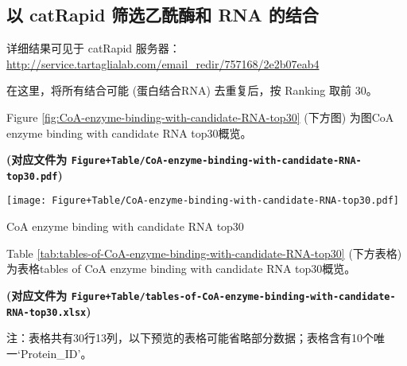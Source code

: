 \documentclass[
]{article}
\begin{document}
\hypertarget{ux4ee5-catrapid-ux7b5bux9009ux4e59ux9170ux9176ux548c-rna-ux7684ux7ed3ux5408}{%
\subsection{以 catRapid 筛选乙酰酶和 RNA 的结合}\label{ux4ee5-catrapid-ux7b5bux9009ux4e59ux9170ux9176ux548c-rna-ux7684ux7ed3ux5408}}

详细结果可见于 catRapid 服务器： \url{http://service.tartaglialab.com/email_redir/757168/2e2b07eab4}

在这里，将所有结合可能 (蛋白结合RNA) 去重复后，按 Ranking 取前 30。

Figure \ref{fig:CoA-enzyme-binding-with-candidate-RNA-top30} (下方图) 为图CoA enzyme binding with candidate RNA top30概览。

\textbf{(对应文件为 \texttt{Figure+Table/CoA-enzyme-binding-with-candidate-RNA-top30.pdf})}

\def\@captype{figure}
\begin{center}
\texttt{[image: Figure+Table/CoA-enzyme-binding-with-candidate-RNA-top30.pdf]}
\caption{CoA enzyme binding with candidate RNA top30}\label{fig:CoA-enzyme-binding-with-candidate-RNA-top30}
\end{center}

Table \ref{tab:tables-of-CoA-enzyme-binding-with-candidate-RNA-top30} (下方表格) 为表格tables of CoA enzyme binding with candidate RNA top30概览。

\textbf{(对应文件为 \texttt{Figure+Table/tables-of-CoA-enzyme-binding-with-candidate-RNA-top30.xlsx})}

\begin{center}\begin{tcolorbox}[colback=gray!10, colframe=gray!50, width=0.9\linewidth, arc=1mm, boxrule=0.5pt]注：表格共有30行13列，以下预览的表格可能省略部分数据；表格含有10个唯一`Protein\_ID'。
\end{tcolorbox}
\end{center}
\end{document}

